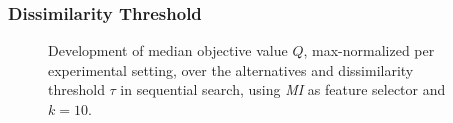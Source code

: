\documentclass[conference]{IEEEtran}
\theoremstyle{definition}
\begin{document}
\subsubsection{Dissimilarity Threshold}

\begin{figure}[t]
	\centering
		\label{fig:impact-num-alternatives-train-objective-tau}
	\hfill
		\label{fig:impact-num-alternatives-test-objective-tau}
	\caption{Development of median objective value $Q$, max-normalized per experimental setting, over the alternatives and dissimilarity threshold $\tau$ in sequential search, using \emph{MI} as feature selector and $k=10$.}
	\label{fig:impact-num-alternatives-objective-tau}
\end{figure}
\end{document}
